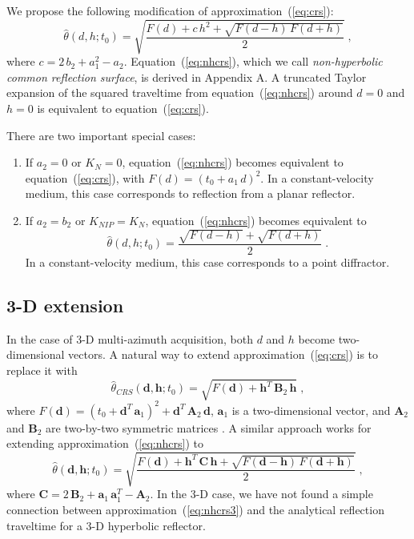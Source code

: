 We propose the following modification of approximation~(\ref{eq:crs}):
\begin{equation}
\widehat{\theta}(d,h;t_0) = \sqrt{\frac{F(d) + c\,h^2
 + \sqrt{F(d-h)\,F(d+h)}}{2}}\;,
\label{eq:nhcrs}
\end{equation}
where $c=2\,b_2+a_1^2-a_2$.  Equation~(\ref{eq:nhcrs}), which we call
\emph{non-hyperbolic common reflection surface}, is derived in
Appendix A. A truncated Taylor expansion of the squared traveltime
from equation~(\ref{eq:nhcrs}) around $d=0$ and $h=0$ is equivalent to
equation~(\ref{eq:crs}).

There are two important special cases:
\begin{enumerate}
\item If $a_2=0$ or $K_N=0$, equation~(\ref{eq:nhcrs}) becomes equivalent to equation~(\ref{eq:crs}), with $F(d) = (t_0 + a_1\,d)^2$. 
In a constant-velocity medium, this case corresponds to reflection from a planar reflector.
\item If $a_2=b_2$ or $K_{NIP}=K_N$, equation~(\ref{eq:nhcrs}) becomes equivalent to 
\begin{equation}
\widehat{\theta}(d,h;t_0) = \frac{\sqrt{F(d-h)}+\sqrt{F(d+h)}}{2}\;.
\label{eq:dsr}
\end{equation}
In a constant-velocity medium, this case corresponds to a point diffractor.
\end{enumerate}

\subsection{3-D extension}

In the case of 3-D multi-azimuth acquisition, both $d$ and $h$ become
two-dimensional vectors. A natural way to extend
approximation~(\ref{eq:crs}) is to replace it with
\begin{equation}
\label{eq:crs3}
\widehat{\theta}_{CRS}(\mathbf{d},\mathbf{h};t_0) = 
\sqrt{F(\mathbf{d}) + \mathbf{h}^T\,\mathbf{B}_2\,\mathbf{h}}\;,
\end{equation}
where $F(\mathbf{d}) = (t_0 + \mathbf{d}^T\,\mathbf{a}_1)^2 +
\mathbf{d}^T\,\mathbf{A}_2\,\mathbf{d}$, $\mathbf{a}_1$ is a
two-dimensional vector, and $\mathbf{A}_2$ and $\mathbf{B}_2$ are
two-by-two symmetric matrices \cite[]{tygel}. A similar approach 
works for extending approximation~(\ref{eq:nhcrs}) to
\begin{equation}
\widehat{\theta}(\mathbf{d},\mathbf{h};t_0) = 
\sqrt{\frac{F(\mathbf{d}) + \mathbf{h}^T\,\mathbf{C}\,\mathbf{h} + 
\sqrt{F(\mathbf{d}-\mathbf{h})\,F(\mathbf{d}+\mathbf{h})}}{2}}\;,
\label{eq:nhcrs3}
\end{equation}
where
$\mathbf{C}=2\,\mathbf{B}_2+\mathbf{a}_1\,\mathbf{a}_1^T-\mathbf{A}_2$.
In the 3-D case, we have not found a simple connection between
approximation~(\ref{eq:nhcrs3}) and the analytical reflection
traveltime for a 3-D hyperbolic reflector.
 
